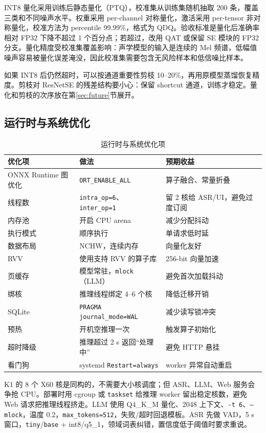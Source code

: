 \documentclass[UTF8,11pt,a4paper,fontset=none]{ctexart}
\begin{document}
INT8 量化采用训练后静态量化（PTQ），校准集从训练集随机抽取 200 条，覆盖三类和不同噪声水平。权重采用 per-channel 对称量化，激活采用 per-tensor 非对称量化，校准方法为 percentile 99.99\%，格式为 QDQ。验收标准是量化后准确率相对 FP32 下降不超过 1 个百分点；若超过，改用 QAT 或保留 SE 模块的 FP32 分支。量化精度受校准集覆盖影响：声学模型的输入是连续的 Mel 频谱，低幅值噪声容易被量化误差淹没，因此校准集需要包含无风险样本和低信噪比样本。

如果 INT8 后仍然超时，可以按通道重要性剪枝 10--20\%，再用原模型蒸馏恢复精度。剪枝对 ResNetSE 的残差结构要小心：保留 shortcut 通道，训练才稳定。量化和剪枝的次序放在第\ref{sec:future}节展开。

\subsection{运行时与系统优化}

\begin{table}[H]
\centering
\small
\caption{运行时与系统优化项}
\label{tab:runtime}
\begin{tabular}{p{3.6cm}p{6.2cm}p{4.6cm}}
\toprule
优化项 & 做法 & 预期收益 \\
\midrule
ONNX Runtime 图优化 & \texttt{ORT\_ENABLE\_ALL} & 算子融合、常量折叠 \\
线程数 & \texttt{intra\_op=6}、\texttt{inter\_op=1} & 留 2 核给 ASR/UI，避免过度订阅 \\
内存池 & 开启 CPU arena & 减少分配抖动 \\
执行模式 & 顺序执行 & 单请求低时延 \\
数据布局 & NCHW，连续内存 & 向量化友好 \\
RVV & 使用支持 RVV 的算子库 & 256-bit 向量加速 \\
页缓存 & 模型常驻，\texttt{mlock}（LLM） & 避免首次加载抖动 \\
绑核 & 推理线程绑定 4--6 个核 & 降低迁移开销 \\
SQLite & \texttt{PRAGMA journal\_mode=WAL} & 减少读写锁冲突 \\
预热 & 开机空推理一次 & 触发算子初始化 \\
超时降级 & 推理超过 2 s 返回“处理中” & 避免 HTTP 悬挂 \\
看门狗 & systemd \texttt{Restart=always} & worker 异常自动重启 \\
\bottomrule
\end{tabular}
\end{table}

K1 的 8 个 X60 核是同构的，不需要大小核调度；但 ASR、LLM、Web 服务会争抢 CPU。部署时用 cgroup 或 \texttt{taskset} 给推理 worker 留出稳定核数，避免 Web 请求把推理线程挤走。LLM 使用 Q4\_K\_M 量化、2048 上下文、\texttt{-t 6}、\texttt{--mlock}，温度 0.2，\texttt{max\_tokens=512}，失败/超时回退模板。ASR 先做 VAD，5 s 窗口，\texttt{tiny}/\texttt{base} + int8/q5\_1，领域词表纠错，置信度低于阈值时要求重说。
\end{document}
